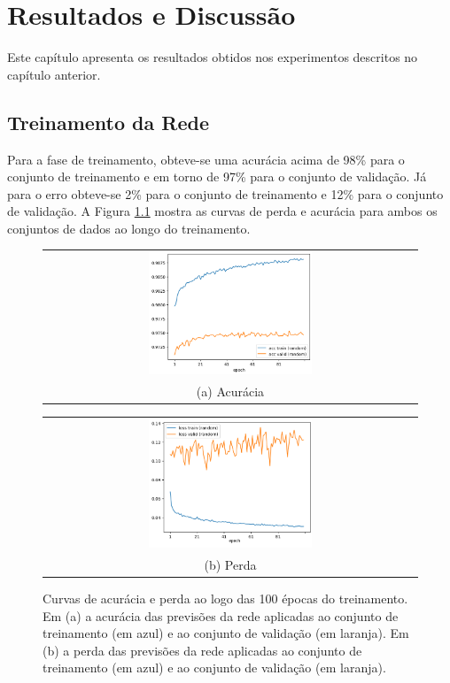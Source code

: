 \chapter[Resultados e Discussão]{Resultados e Discussão}
\label{resultados-e-discussao}

Este capítulo apresenta os resultados obtidos nos experimentos descritos no capítulo anterior.

\section{Treinamento da Rede}

Para a fase de treinamento, obteve-se uma acurácia acima de 98\% para o conjunto de treinamento e em torno de 97\% para o conjunto de validação. Já para o erro obteve-se 2\% para o conjunto de treinamento e 12\% para o conjunto de validação. A Figura \ref{fig:640-acc-loss} mostra as curvas de perda e acurácia para ambos os conjuntos de dados ao longo do treinamento.

\begin{figure}[H]
    \center
    \begin{tabular}{@{}c@{}}
        \includegraphics[width=0.45\textwidth]{figures/4_results/provisorio_640_acc.png}
        \\[\abovecaptionskip]
    \small (a) Acurácia
    \end{tabular}
    \begin{tabular}{@{}c@{}}
        \includegraphics[width=0.45\textwidth]{figures/4_results/provisorio_640_loss.png}
        \\[\abovecaptionskip]
    \small (b) Perda
    \end{tabular}
  
    \caption[Curvas de acurácia e perda ao logo do treinamento.]{Curvas de acurácia e perda ao logo das 100 épocas do treinamento. Em (a) a acurácia das previsões da rede aplicadas ao conjunto de treinamento (em azul) e ao conjunto de validação (em laranja). Em (b) a perda das previsões da rede aplicadas ao conjunto de treinamento (em azul) e ao conjunto de validação (em laranja).}
    \label{fig:640-acc-loss}
\end{figure}

